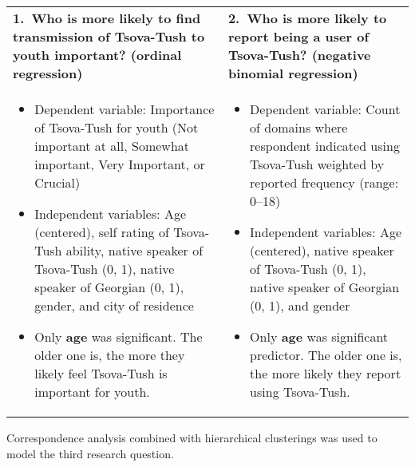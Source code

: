 \documentclass[portrait,fontscale=0.285,a0paper]{baposter2}
\newcommand{\compresslist}{ %
\setlength{\itemsep}{1pt}
\setlength{\parskip}{0pt}
\setlength{\parsep}{0pt}
}
\begin{document}
\begin{poster}
{{\footnotesize
\vspace{0.1in}\begin{tabular}{p{}p{}}
\textbf{1.~Who is more likely to find transmission of Tsova-Tush to youth important? (ordinal regression)} &\textbf{2.~Who is more likely to report being a user of Tsova-Tush? (negative binomial regression)}\\
\vspace{-0.1in}\begin{itemize}[leftmargin=*,rightmargin=0.1in]\compresslist
\item Dependent variable: Importance of Tsova-Tush for youth (Not important at all, Somewhat important, Very Important, or Crucial)
\item Independent variables: Age (centered), self rating of Tsova-Tush ability, native speaker of Tsova-Tush (0, 1), native speaker of Georgian (0, 1), gender, and city of residence
\item Only \textbf{age} was significant. The older one is, the more they likely feel Tsova-Tush is important for youth.
\end{itemize}&

\begin{itemize}[leftmargin=*,rightmargin=0.1in]\compresslist
\item \vspace{-0.1in}Dependent variable: Count of domains where respondent indicated using Tsova-Tush weighted by reported frequency (range: 0--18)
\item Independent variables: Age (centered), native speaker of Tsova-Tush (0, 1), native speaker of Georgian (0, 1), and gender
\item Only \textbf{age} was significant predictor. The older one is, the more likely they report using Tsova-Tush.
\end{itemize}\\
\end{tabular}
}



{\footnotesize Correspondence analysis combined with hierarchical clusterings was used to model the third research question.\\

}}
\end{poster}
\end{document}

